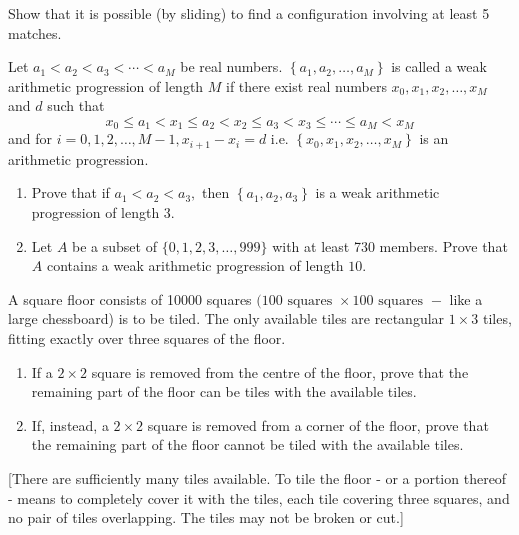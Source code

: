 \documentclass{pset}
\begin{document}
\begin{problems}
\begin{problem}[IrMO 2001 Q7]
\begin{center}
    \end{center}

    Show that it is possible (by sliding) to find a configuration involving at least 5 matches.
\end{problem}

\begin{problem}[IrMO 2000 Q4]
    Let \(a_{1}<a_{2}<a_{3}<\cdots<a_{M}\)
    be real numbers. \(\left\{a_{1}, a_{2}, \ldots, a_{M}\right\}\) is called a weak arithmetic progression of length \(M\) if there exist real numbers \(x_{0}, x_{1}, x_{2}, \ldots, x_{M}\) and \(d\) such that
    $$
    x_{0} \leq a_{1}<x_{1} \leq a_{2}<x_{2} \leq a_{3}<x_{3} \leq \cdots \leq a_{M}<x_{M}
    $$
    and for \(i=0,1,2, \ldots, M-1, x_{i+1}-x_{i}=d\) i.e. \(\left\{x_{0}, x_{1}, x_{2}, \ldots, x_{M}\right\}\) is an arithmetic
    progression.
    \begin{enumerate}
     \item Prove that if \(a_{1}<a_{2}<a_{3},\) then \(\left\{a_{1}, a_{2}, a_{3}\right\}\) is a weak arithmetic progression
    of length 3.
    \item Let \(A\) be a subset of \(\{0,1,2,3, \ldots, 999\}\) with at least 730 members. Prove that
    \(A\) contains a weak arithmetic progression of length \(10 .\)
\end{enumerate}
\end{problem}

\begin{problem}[IrMO 1999 Q4]
    A square floor consists of 10000 squares \((100 \text { squares } \times 100 \text { squares }-\) like a large chessboard) is to be tiled. The only available tiles are rectangular \(1 \times 3\) tiles, fitting exactly over three squares of the floor.
    \begin{enumerate}
    \item If a \(2 \times 2\) square is removed from the centre of the floor, prove that the remaining part of the floor can be tiles with the available tiles.
    \item If, instead, a \(2 \times 2\) square is removed from a corner of the floor, prove that the remaining part of the floor cannot be tiled with the available tiles.
\end{enumerate}
    
    [There are sufficiently many tiles available. To tile the floor - or a portion thereof
    - means to completely cover it with the tiles, each tile covering three squares, and no pair of tiles overlapping. The tiles may not be broken or cut.]
\end{problem}


\end{problems}
\end{document}
